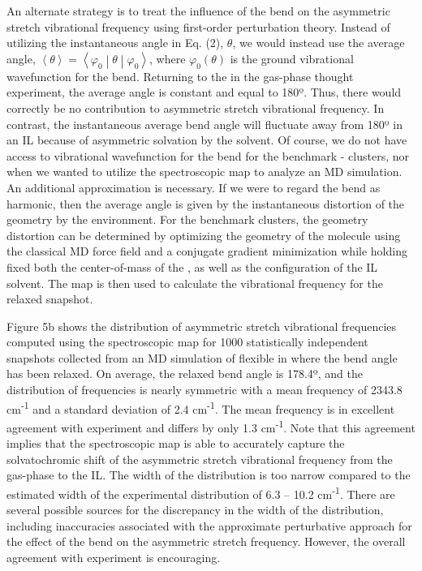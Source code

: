 \documentclass[]{article}
\begin{document}
An alternate strategy is to treat the influence of the  bend on the asymmetric stretch vibrational frequency using first-order perturbation theory. Instead of utilizing the instantaneous  angle in Eq. (2), \(\theta\), we would instead use the average angle, \(\left\langle \theta \right\rangle = \left\langle \varphi_{0} \middle| \theta \middle| \varphi_{0} \right\rangle\), where \(\varphi_{0}(\theta)\) is the ground vibrational wavefunction for the  bend. Returning to the  in the gas-phase thought experiment, the average angle is constant and equal to 180º. Thus, there would correctly be no contribution to  asymmetric stretch vibrational frequency. In contrast, the instantaneous average bend angle will fluctuate away from 180º in an IL because of asymmetric solvation by the solvent. Of course, we do not have access to vibrational wavefunction for the  bend for the benchmark -\ce{[C4C1im][PF6]} clusters, nor when we wanted to utilize the spectroscopic map to analyze an MD simulation. An additional approximation is necessary. If we were to regard the  bend as harmonic, then the average angle is given by the instantaneous distortion of the  geometry by the environment. For the benchmark clusters, the geometry distortion can be determined by optimizing the geometry of the  molecule using the classical MD force field and a conjugate gradient minimization while holding fixed both the center-of-mass of the , as well as the configuration of the IL solvent. The map is then used to calculate the vibrational frequency for the relaxed snapshot.

Figure 5b shows the distribution of  asymmetric stretch vibrational frequencies computed using the spectroscopic map for 1000 statistically independent snapshots collected from an MD simulation of flexible  in \ce{[C4C1im][PF6]} where the  bend angle has been relaxed. On average, the relaxed bend angle is 178.4º, and the distribution of frequencies is nearly symmetric with a mean frequency of 2343.8 cm\textsuperscript{-1} and a standard deviation of 2.4 cm\textsuperscript{-1}. The mean frequency is in excellent agreement with experiment and differs by only 1.3 cm\textsuperscript{-1}. Note that this agreement implies that the spectroscopic map is able to accurately capture the solvatochromic shift of the  asymmetric stretch vibrational frequency from the gas-phase to the \ce{[C4C1im][PF6]} IL. The width of the distribution is too narrow compared to the estimated width of the experimental distribution of 6.3 -- 10.2 cm\textsuperscript{-1}. There are several possible sources for the discrepancy in the width of the distribution, including inaccuracies associated with the approximate perturbative approach for the effect of the bend on the asymmetric stretch frequency. However, the overall agreement with experiment is encouraging.
\end{document}
